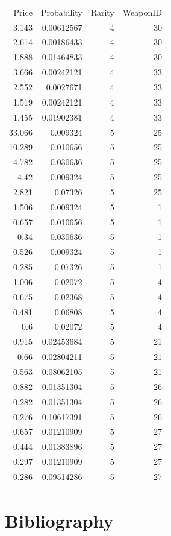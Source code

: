 \documentclass[12pt, letterpaper]{paper}
\begin{document}
\begin{center}
\begin{tabular}{rrrr}
Price & Probability & Rarity & WeaponID\\
3.143 & 0.00612567 & 4 & 30\\
2.614 & 0.00186433 & 4 & 30\\
1.888 & 0.01464833 & 4 & 30\\
3.666 & 0.00242121 & 4 & 33\\
2.552 & 0.0027671 & 4 & 33\\
1.519 & 0.00242121 & 4 & 33\\
1.455 & 0.01902381 & 4 & 33\\
33.066 & 0.009324 & 5 & 25\\
10.289 & 0.010656 & 5 & 25\\
4.782 & 0.030636 & 5 & 25\\
4.42 & 0.009324 & 5 & 25\\
2.821 & 0.07326 & 5 & 25\\
1.506 & 0.009324 & 5 & 1\\
0.657 & 0.010656 & 5 & 1\\
0.34 & 0.030636 & 5 & 1\\
0.526 & 0.009324 & 5 & 1\\
0.285 & 0.07326 & 5 & 1\\
1.006 & 0.02072 & 5 & 4\\
0.675 & 0.02368 & 5 & 4\\
0.481 & 0.06808 & 5 & 4\\
0.6 & 0.02072 & 5 & 4\\
0.915 & 0.02453684 & 5 & 21\\
0.66 & 0.02804211 & 5 & 21\\
0.563 & 0.08062105 & 5 & 21\\
0.882 & 0.01351304 & 5 & 26\\
0.282 & 0.01351304 & 5 & 26\\
0.276 & 0.10617391 & 5 & 26\\
0.657 & 0.01210909 & 5 & 27\\
0.444 & 0.01383896 & 5 & 27\\
0.297 & 0.01210909 & 5 & 27\\
0.286 & 0.09514286 & 5 & 27\\
\end{tabular}
\end{center}



\newpage 

\section{Bibliography}
\label{sec-7}

\nocite{Efficiency}
\nocite{LimeBoy}
\nocite{PriceDataOnly}
\nocite{LitReview}
\nocite{Liquidpedia}
\nocite{SteamMarket}
\nocite{NonAtomic}
\nocite{StructuralEconometrics}


\end{document}
